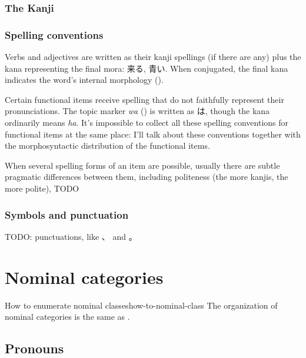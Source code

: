 \documentclass[UTF8, a4paper, oneside, scheme=plain]{ctexrep}
\newcommand*{\citechap}[1]{chap.~{#1}}
\newcommand{\corpus}[1]{\emph{#1}}
\begin{document}
\subsection{The Kanji}\label{sec:kanji}


\subsection{Spelling conventions}\label{sec:spelling-conventions}

Verbs and adjectives are written as their kanji spellings (if there are any)
plus the kana representing the final mora:
来る, 青い.
When conjugated, the final kana indicates the word's internal morphology (). 

Certain functional items receive spelling that do not faithfully represent their pronunciations.
The topic marker \corpus{wa} () is written as は,
though the kana ordinarily means \corpus{ha}.
It's impossible to collect all these spelling conventions for functional items at the same place:
I'll talk about these conventions together with the morphosyntactic distribution of the functional items.

When several spelling forms of an item are possible,
usually there are subtle pragmatic differences between them,
including politeness (the more kanjis, the more polite), TODO

\subsection{Symbols and punctuation}\label{sec:writing-symbols}



TODO: punctuations, like 、 and 。

\chapter{Nominal categories}

\begin{theorybox}{How to enumerate nominal classes}{how-to-nominal-class}
    The organization of nominal categories is the same as \citet[\citechap{3}, \citechap{4}]{Friesen2017}.
\end{theorybox}

\section{Pronouns}
\end{document}
